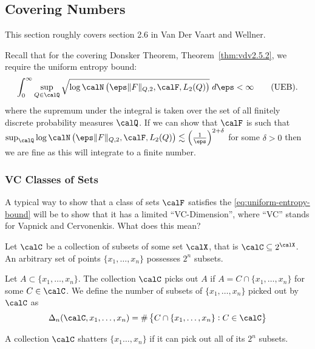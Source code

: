 
\subsection{Covering Numbers}%
\label{subsec:covering}

This section roughly covers section 2.6 in Van Der Vaart and Wellner.

Recall that for the covering Donsker Theorem, Theorem~\ref{thm:vdv2.5.2}, we require the uniform entropy bound:
\[
	\int_{0}^{\infty}  \sup_{Q\in\calQ} \sqrt{\log \calN\left(\eps\|F\|_{Q,2},\calF,L_2(Q)\right)}\;d\eps < \infty\tag{UEB}\label{eq:uniform-entropy-bound-2}
.\] 
where the supremum under the integral is taken over the set of all finitely discrete probability measures \(\calQ\). If we can show that \(\calF\) is such that \(\sup_\calQ \log \calN\left(\eps\|F\|_{Q,2},\calF,L_2(Q)\right) \lesssim \left(\frac{1}{\eps}\right)^{2+\delta}\) for some \(\delta > 0\) then we are fine as this will integrate to a finite number.

\subsubsection{VC Classes of Sets}%
\label{subsubsec:vc-class}

A typical way to show that a class of sets \(\calF\) satisfies the \eqref{eq:uniform-entropy-bound} will be to show that it has a limited ``VC-Dimension'', where ``VC'' stands for Vapnick and Cervonenkis. What does this mean?

Let \(\calC\) be a collection of subsets of some set \(\calX\), that is \(\calC \subseteq 2^\calX\). An arbitrary set of points \(\{x_1,\dots,x_n\}\) possesses \(2^n\) subsets.

\begin{definition}
	\label{def:picks-out}
	Let \(A \subset \{x_1,\dots,x_n\}\). The collection \(\calC\) picks out \(A\) if \(A = C \cap \{x_1,\dots,x_n\}\) for some \(C \in\calC\). We define the number of subsets of \(\{x_1,\dots,x_n\}\) picked out by \(\calC\) as 
	\begin{equation}
		\label{eq:delta-n}
		\Delta_n(\calC,x_1,\dots,x_n) = \#\left\{C\cap\{x_1,\dots,x_n\}:C\in\calC \right\}	
	\end{equation}
\end{definition}

\begin{definition}[Shattering]
	\label{def:shattering}
	A collection \(\calC\) shatters \(\{x_1\dots,x_n\}\) if it can pick out all of its \(2^n\) subsets.
\end{definition}

